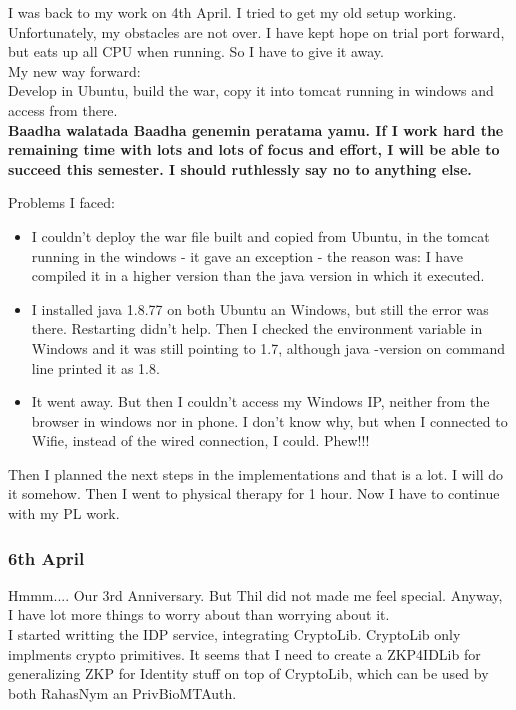 \documentclass[11pt]{article}
\begin{document}
I was back to my work on 4th April. I tried to get my old setup working. Unfortunately, my obstacles are not over. I have kept hope on trial port 
forward, but eats up all CPU when running. So I have to give it away.\\

My new way forward: \\
Develop in Ubuntu, build the war, copy it into tomcat running in windows and access from there.\\

\textbf{Baadha walatada Baadha genemin peratama yamu. If I work hard the remaining time with lots and lots of focus and effort, I will be able to 
succeed this semester. I should ruthlessly say no to anything else.}

Problems I faced:\\
\begin{itemize}
 \item I couldn't deploy the war file built and copied from Ubuntu, in the tomcat running in the windows - it gave an exception - the reason was:
       I have compiled it in a higher version than the java version in which it executed. 
 \item I installed java 1.8.77 on both Ubuntu an Windows, but still the error was there. Restarting didn't help. Then I checked the environment 
variable in Windows and it was still pointing to 1.7, although java -version on command line printed it as 1.8.
 \item It went away. But then I couldn't access my Windows IP, neither from the browser in windows nor in phone. I don't know why, but when I 
connected to Wifie, instead of the wired connection, I could. Phew!!!
\end{itemize}

Then I planned the next steps in the implementations and that is a lot. I will do it somehow. Then I went to physical therapy for 1 hour. Now I have 
to continue with my PL work.

\subsubsection*{6th April}
Hmmm.... Our 3rd Anniversary. But Thil did not made me feel special. Anyway, I have lot more things to worry about than worrying about it.\\

I started writting the IDP service, integrating CryptoLib. CryptoLib only implments crypto primitives. It seems that I need to create a ZKP4IDLib
for generalizing ZKP for Identity stuff on top of CryptoLib, which can be used by both RahasNym an PrivBioMTAuth.\\
\end{document}
